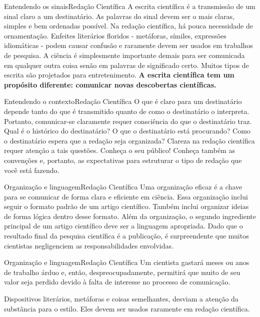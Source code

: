 \documentclass[t]{beamer}
\begin{document}

\begin{ftst}{Entendendo os sinais}{Redação Científica}
\justifying
A escrita científica é a transmissão de um sinal claro a um destinatário. As palavras do sinal devem ser o mais claras, simples e bem ordenadas possível.
\vone
Na redação científica, há pouca necessidade de ornamentação. Enfeites literários floridos - metáforas, símiles, expressões idiomáticas - podem causar confusão e raramente devem ser usados em trabalhos de pesquisa.
\vone
A ciência é simplesmente importante demais para ser comunicada em qualquer outra coisa senão em palavras de significado certo. 
\vone
Muitos tipos de escrita são projetados para entretenimento. \textbf{A escrita científica tem um propósito diferente: comunicar novas descobertas científicas.}



\end{ftst}


\begin{ftst}{Entendendo o contexto}{Redação Científica}
\justifying
O que é claro para um destinatário depende tanto do que é transmitido quanto de como o destinatário o interpreta.
\vone
Portanto, comunicar-se claramente requer consciência do que o destinatário traz. Qual é o histórico do destinatário? O que o destinatário está procurando? Como o destinatário espera que a redação seja organizada? Clareza na redação científica requer atenção a tais questões.
\vone
Conheça o seu público! Conheça também as convenções e, portanto, as expectativas para estruturar o tipo de redação que você está fazendo.



\end{ftst}


\begin{ftst}{Organização e linguagem}{Redação Científica}
\justifying
Uma organização eficaz é a chave para se comunicar de forma clara e eficiente em ciência. 
\vone
Essa organização inclui seguir o formato padrão de um artigo científico. Também inclui organizar ideias de forma lógica dentro desse formato. 
\vone
Além da organização, o segundo ingrediente principal de um artigo científico deve ser a linguagem apropriada.
\vone
Dado que o resultado final da pesquisa científica é a publicação, é surpreendente que muitos cientistas negligenciem as responsabilidades envolvidas. 

\end{ftst}


\begin{ftst}{Organização e linguagem}{Redação Científica}
\justifying
Um cientista gastará meses ou anos de trabalho árduo e, então, despreocupadamente, permitirá que muito de seu valor seja perdido devido à falta de interesse no processo de comunicação.

\vone
Dispositivos literários, metáforas e coisas semelhantes, desviam a atenção da substância para o estilo. Eles devem ser usados raramente em redação científica.

\end{ftst}
\end{document}
